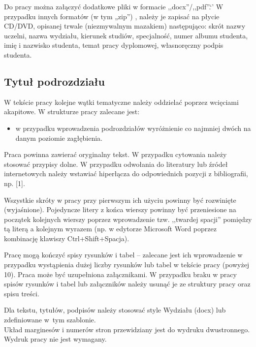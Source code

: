 Do pracy można załączyć dodatkowe pliki w formacie ,,docx''/,,pdf''.`'
W przypadku innych formatów (w tym „zip”) , należy je zapisać na płycie CD/DVD, opisanej trwale (niezmywalnym mazakiem) następująco: skrót nazwy uczelni, nazwa wydziału, kierunek studiów, specjalność, numer albumu studenta, imię i nazwisko studenta, temat pracy dyplomowej, własnoręczny podpis studenta. 

\subsection{Tytuł podrozdziału}

W tekście pracy kolejne wątki tematyczne należy oddzielać poprzez wcięciami akapitowe. W strukturze pracy zalecane jest:
\begin{itemize} 
    \item w przypadku wprowadzenia podrozdziałów wyróżnienie co najmniej dwóch na danym poziomie zagłębienia.
\end{itemize}

Praca powinna zawierać oryginalny tekst. W przypadku cytowania należy stosować przypisy dolne. W przypadku odwołania do literatury lub źródeł internetowych należy wstawiać hiperłącza do odpowiednich pozycji z bibliografii, np. [1].
 
Wszystkie skróty w pracy przy pierwszym ich użyciu powinny być rozwinięte (wyjaśnione). Pojedyncze litery z końca wierszy powinny być przeniesione na początek kolejnych wierszy poprzez wprowadzenie tzw. ,,twardej spacji'' pomiędzy tą literą a kolejnym wyrazem (np. w edytorze Microsoft Word poprzez kombinację klawiszy Ctrl+Shift+Spacja).

Pracę mogą kończyć spisy rysunków i tabel – zalecane jest ich wprowadzenie w przypadku wystąpienia dużej liczby rysunków lub tabel w tekście pracy (powyżej 10). Praca może być uzupełniona załącznikami. W przypadku braku w pracy spisów rysunków i tabel lub załączników należy usunąć je ze struktury pracy oraz spisu treści.

Dla tekstu, tytułów, podpisów należy stosować style Wydziału (docx) lub zdefiniowane w~tym szablonie.\\
Układ marginesów i numerów stron przewidziany jest do wydruku dwustronnego.\\
Wydruk pracy nie jest wymagany.


